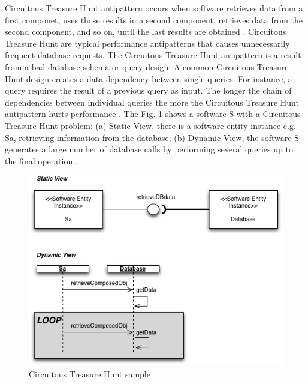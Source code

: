 Circuitous Treasure Hunt antipattern occurs when software retrieves data from a first componet, uses those results in a second component, retrieves data from the second component, and so on, until the last results are obtained \cite{Smith2002} \cite{Smith2003}. Circuitous Treasure Hunt 
are typical performance antipatterns that causes unnecessarily frequent database requests. The Circuitous Treasure Hunt antipattern is a result from a bad database schema or query design. A common Circuitous Treasure Hunt design creates a data dependency between single queries. For instance, a query requires the
result of a previous query as input. The longer the chain of
dependencies between individual queries the more the Circuitous
Treasure Hunt antipattern hurts performance \cite{Wert2014}. The Fig. \ref{fig:circuit}  shows a software S with a Circuitous Treasure Hunt problem: (a) Static View, there is a software entity instance e.g. Sa, retrieving information from the database; (b) Dynamic View, the software  S generates a large number of database calls by performing several queries up to the final operation \cite{Vetoio2011}.


\begin{figure}[h]
\centering
\includegraphics[width=1\textwidth]{./images/circuit.png}
\caption{Circuitous
Treasure Hunt sample \cite{Vetoio2011}}
\label{fig:circuit}
\end{figure}


